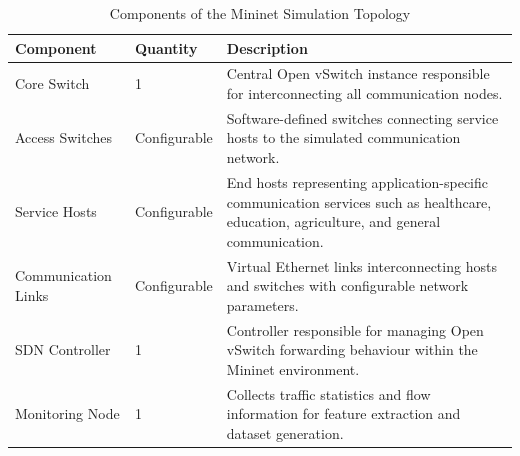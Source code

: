\documentclass[12pt,a4paper]{report}
\begin{document}

	\begin{table}[H]
		\centering
		\caption{Components of the Mininet Simulation Topology}
		\label{tab:topology}
		
		\begin{tabular}{|p{4cm}|p{2.5cm}|p{8cm}|}
			\hline
			
			\textbf{Component} &
			\textbf{Quantity} &
			\textbf{Description}
			\\
			\hline
			
			Core Switch &
			1 &
			Central Open vSwitch instance responsible for interconnecting all communication nodes.
			\\
			\hline
			
			Access Switches &
			Configurable &
			Software-defined switches connecting service hosts to the simulated communication network.
			\\
			\hline
			
			Service Hosts &
			Configurable &
			End hosts representing application-specific communication services such as healthcare, education, agriculture, and general communication.
			\\
			\hline
			
			Communication Links &
			Configurable &
			Virtual Ethernet links interconnecting hosts and switches with configurable network parameters.
			\\
			\hline
			
			SDN Controller &
			1 &
			Controller responsible for managing Open vSwitch forwarding behaviour within the Mininet environment.
			\\
			\hline
			
			Monitoring Node &
			1 &
			Collects traffic statistics and flow information for feature extraction and dataset generation.
			\\
			\hline
			
		\end{tabular}
		
	\end{table}
	
\end{document}
